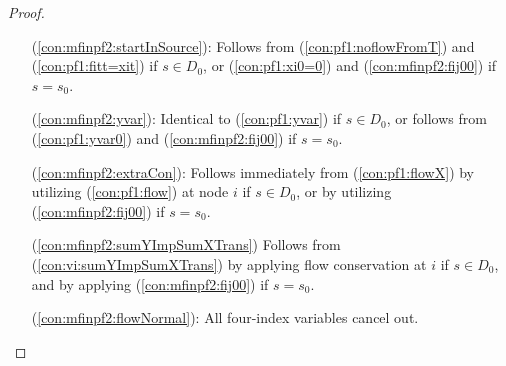 \begin{proof}
\begin{itemize}[leftmargin=1cm]
	Assume first that (L.4a) holds.
	We have that $\exists t\in D_0 \text{ s. t. }f^t_{ij}=x_{ij}$.
	Besides the strict inequality, assumption (\ref{eq:assumContr}) also implies $x_{ij}> 0$ which together with Lemma \ref{lem:onedir} gives $f^t_{ji}=0$.
 	By applying (\ref{con:pf1:xfrel}) to arcs entering $i$,
	$$\sum\limits_{k\in V_i}f^t_{ik} \geq f^t_{ij}=x_{ij}>\sum\limits_{k \in V_i\setminus\{j\}}x_{ki} \geq \sum\limits_{k \in V_i\setminus\{j\}}f^t_{ki}=\sum\limits_{k \in V_i}f^t_{ki},$$
	contradicting flow conservation constraints (\ref{con:pf1:flow}).
	Assume next that (L.4a) does not hold, i.e., $f^*_{ij}<x_{ij}$. 
	We know from Lemma \ref{lem:oneslack} that $x_{ji}=f^*_{ji}$, and so $\exists t\in D_0 \text{ s. t. }f^t_{ji}=x_{ji}$. 
	Moreover, Lemma \ref{lem:onedir} says that if for some $s\in D_0: f^s_{ji}>0$, then $f^s_{ij} = 0$, i.e. any flow that enters $i$ via $(j,i)$ must leave it through an arc different from $(i,j)$.
	Together with the flow conservation and (\ref{con:pf1:xfrel}),
	$$
	x_{ji}=f^t_{ji}\leq\sum_{k\in V_i}f^t_{ik}=\sum_{k\in V_i\setminus\{j\}}f^t_{ik}\leq\sum_{k\in V_i\setminus\{j\}}x_{ik}.
	$$
	Note that for $x_{ji}=f^t_{ji}=0$, $f^t_{ij}\geq 0$ in which case the second equality above would not hold, but we could directly write $x_{ji}\leq\sum_{k\in V_i\setminus\{j\}}x_{ik}$. 
	Combined with the assumption (\ref{eq:assumContr}) we obtain
	$$
	\sum_{k\in V_i}x_{ki} = x_{ji} + \sum_{k\in V_i\setminus\{j\}}x_{ki}<x_{ij} + \sum_{k\in V_i\setminus\{j\}}x_{ik} = \sum_{k\in V_i}x_{ik},
	$$
	contradicting (L.4b), and thereby Lemma \ref{lem:xequals}. 
	The proof applies with minor simplifications also for $s=s_0$.
\item[ (\ref{con:mfinpf2:startInSource}):] Follows from (\ref{con:pf1:noflowFromT}) and (\ref{con:pf1:fitt=xit}) if $s\in D_0$, or (\ref{con:pf1:xi0=0}) and (\ref{con:mfinpf2:fij00}) if $s=s_0$.
\item[ (\ref{con:mfinpf2:yvar}):] Identical to (\ref{con:pf1:yvar}) if $s\in D_0$, or follows from (\ref{con:pf1:yvar0}) and (\ref{con:mfinpf2:fij00}) if $s=s_0$.
\item[ (\ref{con:mfinpf2:extraCon}):] Follows immediately from (\ref{con:pf1:flowX}) by utilizing (\ref{con:pf1:flow}) at node $i$ if $s\in D_0$, or by utilizing (\ref{con:mfinpf2:fij00}) if $s=s_0$.
\item[(\ref{con:mfinpf2:sumYImpSumXTrans})] Follows from (\ref{con:vi:sumYImpSumXTrans}) by applying flow conservation at $i$ if $s\in D_0$, and by applying (\ref{con:mfinpf2:fij00}) if $s=s_0$. 
\item[(\ref{con:mfinpf2:flowNormal}):] All four-index variables cancel out. 

\end{itemize}
\end{proof}
